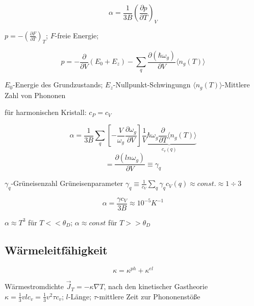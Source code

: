 \[\boxed{\alpha = \frac{1}{3B}\left( \frac{\partial p}{\partial T}\right)_V }\]


\( p = - \left( \frac{\partial F}{\partial T}\right)_T\); \(F\)-freie Energie;

 \[ p = -\frac{\partial}{\partial V}(E_0+E_z) -\sum_q\frac{\partial(\hbar \omega_g)}{\partial V}\langle n_g(T)\rangle\] 


\(E_0\)-Energie des Grundzustands; \(E_z\)-Nullpunkt-Schwingungn \(\langle n_g(T)\rangle\)-Mittlere Zahl von Phononen

für harmonischen Kristall: \(c_P=c_V\)

 
\[\alpha = \frac{1}{3B}\sum_q\left[-\frac{V}{\omega_g}\frac{\partial \omega_g}{\partial V}  \right]\underbrace{\frac{1}{V}\hbar \omega_g\frac{\partial}{\partial T}\langle n_g(T)\rangle}_{c_v(q)}\]
\[ = \frac{\partial(ln\omega_g)}{\partial V} \equiv \gamma_q\]

\(\gamma_q\)-Grüneisenzahl
Grüneisenparameter \(\gamma_q\equiv \frac{1}{c_V}\sum_q\gamma_qc_V(q)\approx const. \approx 1\div 3\)

\[\boxed{\alpha = \frac{\gamma c_V}{3B}\approx 10^{-5}K^{-1}}\]

\(\alpha\approx T^3\) für \(T<<\theta_D\); \(\alpha\approx const\) für \(T>>\theta_D\)

\subsection{Wärmeleitfähigkeit}

\[ \kappa = \kappa^{ph}+\kappa^{el}\]

Wärmestromdichte \(\vec J_T = -\kappa\nabla T\), nach den kinetischer Gastheorie \(\kappa = \frac{1}{3}vlc_v = \frac{1}{3}v^2\tau c_v\); \(l\)-Länge; \(\tau\)-mittlere Zeit zur Phononenstöße

